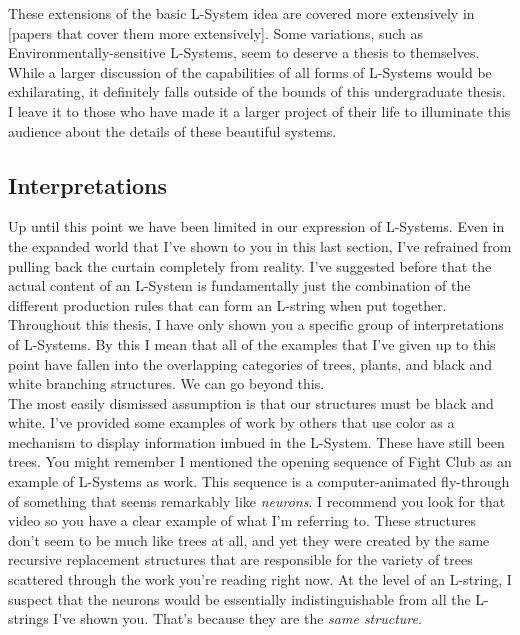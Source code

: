 \documentclass[12pt,twoside]{reedthesis}
\begin{document}
	These extensions of the basic L-System idea are covered more extensively in [papers that cover them more extensively]. Some variations, such as Environmentally-sensitive L-Systems, seem to deserve a thesis to themselves. While a larger discussion of the capabilities of all forms of L-Systems would be exhilarating, it definitely falls outside of the bounds of this undergraduate thesis. I leave it to those who have made it a larger project of their life to illuminate this audience about the details of these beautiful systems.\\
	
	\subsection{Interpretations}
	Up until this point we have been limited in our expression of L-Systems. Even in the expanded world that I've shown to you in this last section, I've refrained from pulling back the curtain completely from reality. I've suggested before that the actual content of an L-System is fundamentally just the combination of the different production rules that can form an L-string when put together. Throughout this thesis, I have only shown you a specific group of interpretations of L-Systems. By this I mean that all of the examples that I've given up to this point have fallen into the overlapping categories of trees, plants, and black and white branching structures. We can go beyond this.\\
	
	The most easily dismissed assumption is that our structures must be black and white. I've provided some examples of work by others that use color as a mechanism to display information imbued in the L-System. These have still been trees. You might remember I mentioned the opening sequence of Fight Club as an example of L-Systems as work. This sequence is a computer-animated fly-through of something that seems remarkably like \textit{neurons}. I recommend you look for that video so you have a clear example of what I'm referring to. These structures don't seem to be much like trees at all, and yet they were created by the same recursive replacement structures that are responsible for the variety of trees scattered through the work you're reading right now. At the level of an L-string, I suspect that the neurons would be essentially indistinguishable from all the L-strings I've shown you. That's because they are the \textit{same structure}.\\
	
\end{document}
